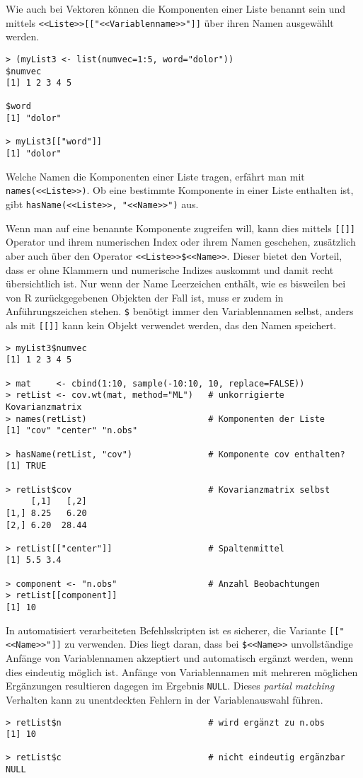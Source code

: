 Wie auch bei Vektoren können die Komponenten einer Liste benannt sein und mittels \lstinline!<<Liste>>[["<<Variablenname>>"]]! über ihren Namen ausgewählt werden.
\begin{lstlisting}
> (myList3 <- list(numvec=1:5, word="dolor"))
$numvec
[1] 1 2 3 4 5

$word
[1] "dolor"

> myList3[["word"]]
[1] "dolor"
\end{lstlisting}

Welche Namen die Komponenten einer Liste tragen, erfährt man mit \lstinline!names(<<Liste>>)!. Ob eine bestimmte Komponente in einer Liste enthalten ist, gibt \lstinline!hasName(<<Liste>>, "<<Name>>")! aus.

Wenn man auf eine benannte Komponente zugreifen will, kann dies mittels \lstinline![[]]! Operator und ihrem numerischen Index oder ihrem Namen geschehen, zusätzlich aber auch über den Operator \lstinline!<<Liste>>$<<Name>>!. Dieser bietet den Vorteil, dass er ohne Klammern und numerische Indizes auskommt und damit recht übersichtlich ist. Nur wenn der Name Leerzeichen enthält, wie es bisweilen bei von R zurückgegebenen Objekten der Fall ist, muss er zudem in Anführungszeichen stehen. \lstinline!$! benötigt immer den Variablennamen selbst, anders als mit \lstinline![[]]! kann kein Objekt verwendet werden, das den Namen speichert.
\begin{lstlisting}
> myList3$numvec
[1] 1 2 3 4 5

> mat     <- cbind(1:10, sample(-10:10, 10, replace=FALSE))
> retList <- cov.wt(mat, method="ML")   # unkorrigierte Kovarianzmatrix
> names(retList)                        # Komponenten der Liste
[1] "cov" "center" "n.obs"

> hasName(retList, "cov")               # Komponente cov enthalten?
[1] TRUE

> retList$cov                           # Kovarianzmatrix selbst
     [,1]   [,2]
[1,] 8.25   6.20
[2,] 6.20  28.44

> retList[["center"]]                   # Spaltenmittel
[1] 5.5 3.4

> component <- "n.obs"                  # Anzahl Beobachtungen
> retList[[component]]
[1] 10
\end{lstlisting}

In automatisiert verarbeiteten Befehlsskripten ist es sicherer, die Variante \lstinline![["<<Name>>"]]! zu verwenden. Dies liegt daran, dass bei \lstinline!$<<Name>>! unvollständige Anfänge von Variablennamen akzeptiert und automatisch ergänzt werden, wenn dies eindeutig möglich ist. Anfänge von Variablennamen mit mehreren möglichen Ergänzungen resultieren dagegen im Ergebnis \lstinline!NULL!. Dieses \emph{partial matching} Verhalten kann zu unentdeckten Fehlern in der Variablenauswahl führen.
\begin{lstlisting}
> retList$n                             # wird ergänzt zu n.obs
[1] 10

> retList$c                             # nicht eindeutig ergänzbar
NULL
\end{lstlisting}

